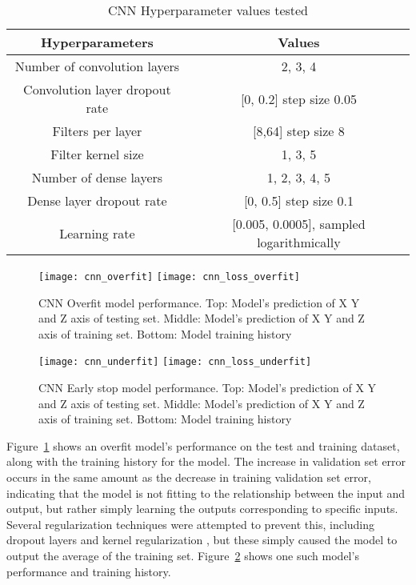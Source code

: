 \documentclass[12pt]{article}
\begin{document}
\begin{table}[h!]
    \begin{center}
    \begin{tabular}{ |c|c| } 
    \hline
        Hyperparameters & Values\\ 
    \hline
        Number of convolution layers & 2, 3, 4\\
        Convolution layer dropout rate & [0, 0.2] step size 0.05 \\ 
        Filters per layer & [8,64] step size 8 \\
        Filter kernel size & 1, 3, 5\\
        Number of dense layers & 1, 2, 3, 4, 5\\
        Dense layer dropout rate & [0, 0.5] step size 0.1 \\ 
        Learning rate & [0.005, 0.0005], sampled logarithmically\\
    \hline
    \end{tabular}
    \end{center}
    \caption{CNN Hyperparameter values tested}
    \label{table:2}
\end{table}

\begin{figure}[h]
  \centering
  \texttt{[image: cnn\_overfit]}
  \texttt{[image: cnn\_loss\_overfit]}
  \caption{CNN Overfit model performance. Top: Model's prediction of X Y and Z axis of testing set. Middle: Model's prediction of X Y and Z axis of training set. Bottom: Model training history}
  \label{cnn_overfit}
\end{figure}

\begin{figure}[h]
  \centering
  \texttt{[image: cnn\_underfit]}
  \texttt{[image: cnn\_loss\_underfit]}
  \caption{CNN Early stop model performance. Top: Model's prediction of X Y and Z axis of testing set. Middle: Model's prediction of X Y and Z axis of training set. Bottom: Model training history}
  \label{cnn_underfit}
\end{figure}

Figure~\ref{cnn_overfit} shows an overfit model's performance on the test and training dataset, along with the training history for the model. The increase in validation set error occurs in the same amount as the decrease in training validation set error, indicating that the model is not fitting to the relationship between the input and output, but rather simply learning the outputs corresponding to specific inputs. Several regularization techniques were attempted to prevent this, including dropout layers \cite{JMLR:v15:srivastava14a} and kernel regularization \cite{DBLP:journals/corr/abs-1205-2653}, but these simply caused the model to output the average of the training set. Figure~\ref{cnn_underfit} shows one such model's performance and training history. 
\end{document}
